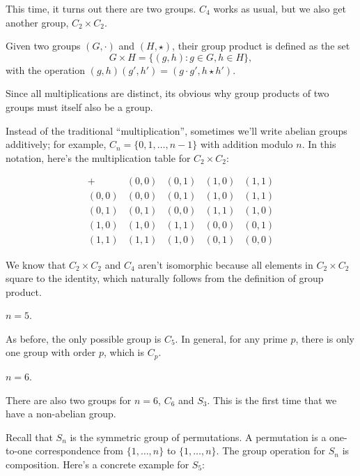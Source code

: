 This time, it turns out there are two groups. $C_4$ works as usual, but we also get another group, $C_2\times C_2$. 

\begin{definition}

Given two groups $(G,\cdot)$ and $(H, \star)$, their \ac{group product} is defined as the set
\[G\times H = \{(g,h) : g\in G, h\in H\},\]
with the operation $(g,h)(g',h') = (g\cdot g', h\star h')$. 
\end{definition}

Since all multiplications are distinct, its obvious why group products of two groups must itself also be a group.

Instead of the traditional ``multiplication'', sometimes we'll write abelian groups additively; for example, $C_n = \{0,1,\hdots, n-1\}$ with addition modulo $n$. In this notation, here's the multiplication table for $C_2\times C_2$: 

\[\begin{array}{c|cccc}
     + & (0,0) & (0,1) & (1,0) & (1,1) \\
     \hline
     (0,0) & (0,0) & (0,1) & (1,0) & (1,1) \\
     (0,1) & (0,1) & (0,0) & (1,1) & (1,0) \\
     (1,0) & (1,0) & (1,1) & (0,0) & (0,1) \\
     (1,1) & (1,1) & (1,0) & (0,1) & (0,0) 
\end{array}\]

We know that $C_2\times C_2$ and $C_4$ aren't isomorphic because all elements in $C_2\times C_2$ square to the identity, which naturally follows from the definition of group product. 

\begin{example}
\exlabel

$n=5$.
\end{example}

As before, the only possible group is $C_5$. In general, for any prime $p$, there is only one group with order $p$, which is $C_p$. 

\begin{example}
\exlabel

$n=6$.
\end{example}

There are also two groups for $n=6$, $C_6$ and $S_3$. This is the first time that we have a non-abelian group. 

Recall that $S_n$ is the symmetric group of permutations. A permutation is a one-to-one correspondence from $\{1,\hdots, n\}$ to $\{1,\hdots, n\}$. The group operation for $S_n$ is composition. Here's a concrete example for $S_5$:

